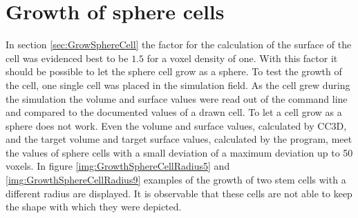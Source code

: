 \section{Growth of sphere cells}\label{sec:GrowSphereCells}
In section \ref{sec:GrowSphereCell} the factor for the calculation of the surface of the cell was evidenced best to be $1.5$ for a voxel density of one. With this factor it should be possible to let the sphere cell grow as a sphere. To test the growth of the cell, one single cell was placed in the simulation field. As the cell grew during the simulation the volume and surface values were read out of the command line and compared to the documented values of a drawn cell. \newline
To let a cell grow as a sphere does not work. Even the volume and surface values, calculated by \ac{CC3D}, and the target volume and target surface values, calculated by the program, meet the values of sphere cells with a small deviation of a maximum deviation up to 50 voxels. \newline
In figure \ref{img:GrowthSphereCellRadius5} and \ref{img:GrowthSphereCellRadius9} examples of the growth of two stem cells with a different radius are displayed. It is observable that these cells are not able to keep the shape with which they were depicted.


